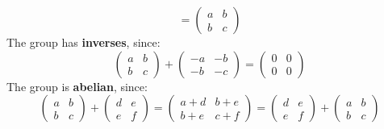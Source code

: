 \documentclass{article}
\begin{document}
\begin{enumerate}
\begin{enumerate}
\[                = \begin{pmatrix} a & b \\ b & c \end{pmatrix}
            \]
            The group has \textbf{inverses}, since:
            \[
                \begin{pmatrix} a & b \\ b & c \end{pmatrix} + \begin{pmatrix} -a & -b \\ -b & -c \end{pmatrix}
                = \begin{pmatrix} 0 & 0 \\ 0 & 0 \end{pmatrix}
            \]
            The group is \textbf{abelian}, since:
            \[
                \begin{pmatrix} a & b \\ b & c \end{pmatrix} + \begin{pmatrix} d & e \\ e & f \end{pmatrix}
                = \begin{pmatrix} a+d & b+e \\ b+e & c+f \end{pmatrix}
                = \begin{pmatrix} d & e \\ e & f \end{pmatrix} + \begin{pmatrix} a & b \\ b & c \end{pmatrix}
            \]


\end{enumerate}
\end{enumerate}
\end{document}
